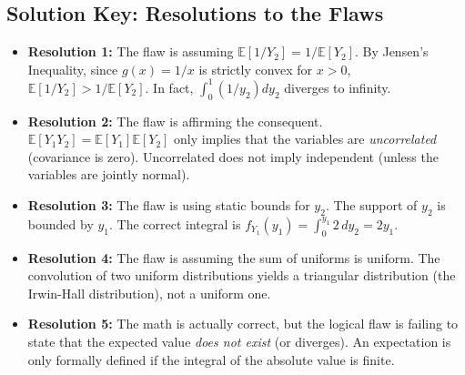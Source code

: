 \documentclass[11pt, a4paper]{article}
\theoremstyle{definition}
\theoremstyle{remark}
\newcommand{\E}{\mathbb{E}}
\begin{document}
\subsection*{Solution Key: Resolutions to the Flaws}
\begin{itemize}
    \item \textbf{Resolution 1:} The flaw is assuming $\E[1/Y_2] = 1/\E[Y_2]$. By Jensen's Inequality, since $g(x) = 1/x$ is strictly convex for $x>0$, $\E[1/Y_2] > 1/\E[Y_2]$. In fact, $\int_0^1 (1/y_2) dy_2$ diverges to infinity.
    \item \textbf{Resolution 2:} The flaw is affirming the consequent. $\E[Y_1 Y_2] = \E[Y_1]\E[Y_2]$ only implies that the variables are \textit{uncorrelated} (covariance is zero). Uncorrelated does not imply independent (unless the variables are jointly normal).
    \item \textbf{Resolution 3:} The flaw is using static bounds for $y_2$. The support of $y_2$ is bounded by $y_1$. The correct integral is $f_{Y_1}(y_1) = \int_0^{y_1} 2 \, dy_2 = 2y_1$.
    \item \textbf{Resolution 4:} The flaw is assuming the sum of uniforms is uniform. The convolution of two uniform distributions yields a triangular distribution (the Irwin-Hall distribution), not a uniform one.
    \item \textbf{Resolution 5:} The math is actually correct, but the logical flaw is failing to state that the expected value \textit{does not exist} (or diverges). An expectation is only formally defined if the integral of the absolute value is finite.
\end{itemize}
\end{document}
